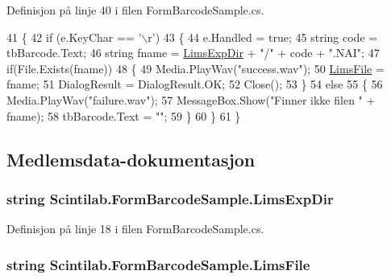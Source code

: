 Definisjon på linje 40 i filen Form\+Barcode\+Sample.\+cs.


\begin{DoxyCode}
41         \{
42             \textcolor{keywordflow}{if} (e.KeyChar == \textcolor{charliteral}{'\(\backslash\)r'})
43             \{
44                 e.Handled = \textcolor{keyword}{true};
45                 \textcolor{keywordtype}{string} code = tbBarcode.Text;
46                 \textcolor{keywordtype}{string} fname = \hyperlink{class_scintilab_1_1_form_barcode_sample_ab07f8e1b4f86eff4eee9dd0df093b95e}{LimsExpDir} + \textcolor{stringliteral}{"/"} + code + \textcolor{stringliteral}{".NAI"};
47                 \textcolor{keywordflow}{if}(File.Exists(fname))
48                 \{
49                     Media.PlayWav(\textcolor{stringliteral}{"success.wav"});
50                     \hyperlink{class_scintilab_1_1_form_barcode_sample_a6e6b1399a344752042376c38841cdbb8}{LimsFile} = fname;
51                     DialogResult = DialogResult.OK;
52                     Close();
53                 \}
54                 \textcolor{keywordflow}{else}
55                 \{
56                     Media.PlayWav(\textcolor{stringliteral}{"failure.wav"});
57                     MessageBox.Show(\textcolor{stringliteral}{"Finner ikke filen "} + fname);
58                     tbBarcode.Text = \textcolor{stringliteral}{""};
59                 \}
60             \}
61         \}
\end{DoxyCode}


\subsection{Medlemsdata-\/dokumentasjon}
\hypertarget{class_scintilab_1_1_form_barcode_sample_ab07f8e1b4f86eff4eee9dd0df093b95e}{
\subsubsection[{Lims\+Exp\+Dir}]{\setlength{\rightskip}{0pt plus 5cm}string Scintilab.\+Form\+Barcode\+Sample.\+Lims\+Exp\+Dir}}\label{class_scintilab_1_1_form_barcode_sample_ab07f8e1b4f86eff4eee9dd0df093b95e}


Definisjon på linje 18 i filen Form\+Barcode\+Sample.\+cs.

\hypertarget{class_scintilab_1_1_form_barcode_sample_a6e6b1399a344752042376c38841cdbb8}{
\subsubsection[{Lims\+File}]{\setlength{\rightskip}{0pt plus 5cm}string Scintilab.\+Form\+Barcode\+Sample.\+Lims\+File\hspace{0.3cm}{\ttfamily [private]}}}\label{class_scintilab_1_1_form_barcode_sample_a6e6b1399a344752042376c38841cdbb8}


